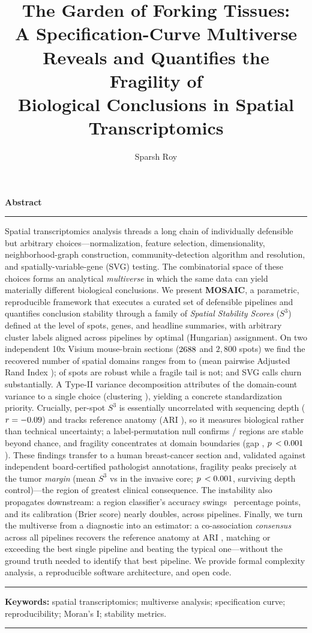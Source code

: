 \documentclass[10pt]{article}
\title{\vspace{-1.2cm}\color{darkblue}\bfseries The Garden of Forking Tissues:\\[2pt]
\large A Specification-Curve Multiverse Reveals and Quantifies the Fragility of\\
Biological Conclusions in Spatial Transcriptomics}
\author{Sparsh Roy}
\affil{Independent researcher \quad$\cdot$\quad Correspondence: \texttt{github.com/ImSpxrsh}}
\date{}
\begin{document}
\maketitle
\thispagestyle{fancy}

{\color{darkblue}\large\bfseries Abstract}
\vspace{2pt}\hrule\vspace{5pt}
{\small\noindent
Spatial transcriptomics analysis threads a long chain of individually defensible but
arbitrary choices---normalization, feature selection, dimensionality, neighborhood-graph
construction, community-detection algorithm and resolution, and spatially-variable-gene
(SVG) testing. The combinatorial space of these choices forms an analytical
\emph{multiverse} in which the same data can yield materially different biological
conclusions. We present \textbf{MOSAIC}, a parametric, reproducible framework that executes
a curated set of \Nspecs{} defensible pipelines and quantifies conclusion stability through
a family of \emph{Spatial Stability Scores} ($S^3$) defined at the level of spots, genes,
and headline summaries, with arbitrary cluster labels aligned across pipelines by optimal
(Hungarian) assignment. On two independent 10x Visium mouse-brain sections
($2688{}$ and $2{,}800$ spots) we find the recovered number of spatial domains ranges
from \ClustMin{} to \ClustMax{} (mean pairwise Adjusted Rand Index \AriMean{}); \SpotStableFrac{}
of spots are robust while a fragile tail is not; and SVG calls churn substantially. A
Type-II variance decomposition attributes \VarTopFrac{} of the domain-count variance to a
single choice (clustering \VarTopAxis{}), yielding a concrete standardization priority.
Crucially, per-spot $S^3$ is essentially uncorrelated with sequencing depth
($r=-0.09{}$) and tracks reference anatomy (ARI \RefAriMean{}), so it measures
biological rather than technical uncertainty; a label-permutation null confirms
\RegionsStable{}/\NregionsTotal{} regions are stable beyond chance, and fragility concentrates
at domain boundaries (gap \StakesGap{}, $p\,<0.001{}$). These findings transfer to a human
breast-cancer section and, validated against independent board-certified pathologist
annotations, fragility peaks precisely at the tumor \emph{margin} (mean $S^3$ \PathMarginS{}
vs \PathInvasiveS{} in the invasive core; $p\,<0.001{}$, surviving depth control)---the region
of greatest clinical consequence. The instability also propagates
downstream: a region classifier's accuracy swings \DownstreamRangePP{}~percentage points, and
its calibration (Brier score) nearly doubles, across pipelines. Finally, we turn the multiverse
from a diagnostic into an estimator: a co-association \emph{consensus} across all pipelines
recovers the reference anatomy at ARI \ConsensusARI{}, matching or exceeding the best single
pipeline and beating the typical one---without the ground truth needed to identify that best
pipeline. We provide formal complexity analysis, a reproducible software architecture, and open
code.\par}
\vspace{5pt}\hrule

\vspace{4pt}
\noindent\textbf{Keywords:} spatial transcriptomics; multiverse analysis; specification
curve; reproducibility; Moran's I; stability metrics.
\vspace{4pt}
\hrule
\vspace{6pt}





\end{document}
